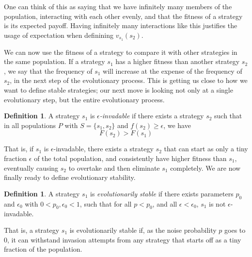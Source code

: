 \documentclass[11pt]{amsart}
\theoremstyle{definition}
\newtheorem{definition}[theorem]{Definition}
\theoremstyle{remark}
\begin{document}
One can think of this as saying that we have infinitely many members of the population, interacting with each other evenly, and that the fitness of a strategy is its expected payoff. Having infinitely many interactions like this justifies the usage of expectation when definining $v_{s_1}(s_2)$.

We can now use the fitness of a strategy to compare it with other strategies in the same population. If a strategy $s_1$ has a higher fitness than another strategy $s_2$, we say that the frequency of $s_1$ will increase at the expense of the frequency of $s_2$, in the next step of the evolutionary process. This is getting us close to how we want to define stable strategies; our next move is looking not only at a single evolutionary step, but the entire evolutionary process.

\begin{definition}
  A strategy $s_1$ is \textit{$\epsilon$-invadable} if there exists a strategy $s_2$ such that in all populations $P$ with $S = \{s_1,s_2\}$ and $f(s_2) \geq \epsilon$, we have 
  \begin{equation*}
    \label{fitnesscond}
    F(s_2) > F(s_1)
  \end{equation*}
\end{definition}

That is, if $s_1$ is $\epsilon$-invadable, there exists a strategy $s_2$ that can start as only a tiny fraction $\epsilon$ of the total population, and consistently have higher fitness than $s_1$, eventually causing $s_2$ to overtake and then eliminate $s_1$ completely. We are now finally ready to define evolutionary stability.

\begin{definition}
  A strategy $s_1$ is \textit{evolutionarily stable} if there exists parameters $p_0$ and $\epsilon_0$ with $0 < p_0, \epsilon_0 < 1$, such that for all $p < p_0$, and all $\epsilon < \epsilon_0$, $s_1$ is not $\epsilon$-invadable.
\end{definition}


That is, a strategy $s_1$ is evolutionarily stable if, as the noise probability $p$ goes to 0, it can withstand invasion attempts from any strategy that starts off as a tiny fraction of the population.
\end{document}
